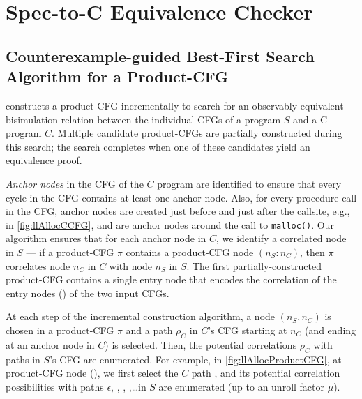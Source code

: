 \section{Spec-to-C Equivalence Checker}
\label{sec:spectocalgo}

\subsection[Counterexample-guided Product-CFG Construction]{Counterexample-guided Best-First Search Algorithm for a Product-CFG}
\label{sec:searchAlgoFormal}
\toolName{} constructs a product-CFG incrementally to search for
an observably-equivalent bisimulation relation between
the individual CFGs of a \SpecL{} program $S$ and a C program $C$.
Multiple candidate product-CFGs are partially constructed
during this search; the search completes when one of these
candidates yield an equivalence proof.

{\em Anchor nodes} in the CFG of the $C$ program
are identified to ensure that every cycle in the CFG
contains at least one anchor node. Also, for
every procedure call in the CFG, anchor nodes
are created just before and just after the callsite, e.g.,
in \cref{fig:llAllocCCFG},  and  are anchor
nodes around the call to {\tt malloc()}.
Our algorithm
ensures that for each anchor node in $C$, we
identify a correlated node in $S$ --- if
a product-CFG $\pi$
contains a product-CFG node $(n_S:n_C)$, then $\pi$
correlates node $n_C$
in $C$ with node $n_S$ in $S$.
The
first partially-constructed product-CFG
contains a single entry node
that encodes the correlation of the entry nodes ()
of the two input CFGs.

At each step of the incremental construction algorithm,
a node $(n_S,n_C)$ is chosen in a product-CFG $\pi$
and a path $\rho_C$ in $C$'s CFG starting at $n_C$ (and
ending at an anchor node in $C$) is selected.
Then, the potential correlations $\rho_C$
with paths
in $S$'s CFG are enumerated.
For
example, in \cref{fig:llAllocProductCFG}, at product-CFG
node (), we first select the $C$ path ,
and its potential correlation possibilities
with paths $\epsilon$, , , ,\ldots in $S$ are enumerated (up to an unroll factor $\mu$).

